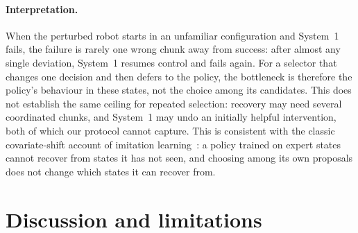\documentclass[11pt]{article}
\begin{document}


\paragraph{Interpretation.} When the perturbed robot starts in an unfamiliar configuration and System~1 fails, the failure is rarely one wrong chunk away from success: after almost any single deviation, System~1 resumes control and fails again. For a selector that changes one decision and then defers to the policy, the bottleneck is therefore the policy's behaviour in these states, not the choice among its candidates. This does not establish the same ceiling for repeated selection: recovery may need several coordinated chunks, and System~1 may undo an initially helpful intervention, both of which our protocol cannot capture. This is consistent with the classic covariate-shift account of imitation learning~\citep{ross2011dagger}: a policy trained on expert states cannot recover from states it has not seen, and choosing among its own proposals does not change which states it can recover from.

\section{Discussion and limitations}
\end{document}
